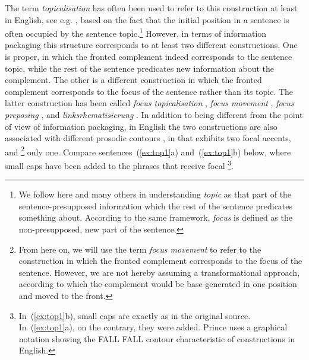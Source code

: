 \documentclass[output=paper]{LSP/langsci}
\begin{document}
\begin{exe}  
  \ex{}
  \begin{xlist}
  \end{xlist}
  \label{ex:song}
\end{exe}

The term {\em topicalisation} has often been used to refer to this
construction at least in English, see e.g.  \cite{Lambrecht1994},
based on the fact that the initial position in a sentence is often
occupied by the sentence topic.\footnote{We follow here
  \citet{Lambrecht1994} and many others in understanding {\em topic}
  as that part of the sentence-presupposed information which the rest
  of the sentence predicates something about. %
  According to the
  same framework, {\em focus} is defined as the non-presupposed, new
  part of the sentence.}  However, in terms of information packaging
this  structure corresponds to at least two different
constructions. One is  proper, in which the fronted
complement indeed corresponds to the sentence topic, while the rest of
the sentence predicates new information about the complement. The
other is a different construction in which the fronted complement
corresponds to the focus of the sentence rather than its topic. The
latter construction has been called {\em focus topicalisation}
\citep{Gundel1974}, {\em focus movement} \citep{Prince1981a}, {\em
  focus preposing} \citep{Vallduvi1992, Ward1996}, and {\em
  linksrhematisierung} \citep{Stempel1981}. In addition to being
different from the point of view of information packaging, in English
the two constructions are also associated with different prosodic
contours \citep{Chafe1976}, in that  exhibits two focal
accents, and \footnote{From here on, we will use the
  term {\em focus movement} to refer to the construction in which the
  fronted complement corresponds to the focus of the
  sentence. However, we are not hereby assuming a transformational
  approach, according to which the complement would be base-generated
  in one position and moved to the front.} only one. Compare
sentences~(\ref{ex:top1}a) and~(\ref{ex:top1}b) below, where small
caps have been added to the phrases that receive focal
\footnote{In~(\ref{ex:top1}b), small caps are exactly as in the
  original source. In~(\ref{ex:top1}a), on the contrary, they were
  added. Prince uses a graphical notation showing the FALL FALL
  contour characteristic of  constructions in English.}.
\end{document}

